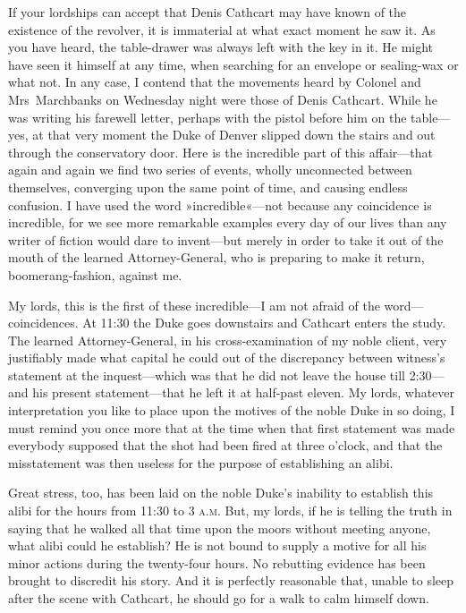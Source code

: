 \begin{dialogue}
 If your lordships can accept that Denis Cathcart may have known of the existence of the revolver, it is immaterial at what exact moment he saw it. As you have heard, the table-drawer was always left with the key in it. He might have seen it himself at any time, when searching for an envelope or sealing-wax or what not. In any case, I contend that the movements heard by Colonel and Mrs~Marchbanks on Wednesday night were those of Denis Cathcart. While he was writing his farewell letter, perhaps with the pistol before him on the table—yes, at that very moment the Duke of Denver slipped down the stairs and out through the conservatory door. Here is the incredible part of this affair—that again and again we find two series of events, wholly unconnected between themselves, converging upon the same point of time, and causing endless confusion. I have used the word »incredible«—not because any coincidence is incredible, for we see more remarkable examples every day of our lives than any writer of fiction would dare to invent—but merely in order to take it out of the mouth of the learned Attorney-General, who is preparing to make it return, boomerang-fashion, against me. 

\smallskip 

My lords, this is the first of these incredible—I am not afraid of the word—coincidences. At 11:30 the Duke goes downstairs and Cathcart enters the study. The learned Attorney-General, in his cross-examination of my noble client, very justifiably made what capital he could out of the discrepancy between witness's statement at the inquest—which was that he did not leave the house till 2:30—and his present statement—that he left it at half-past eleven. My lords, whatever interpretation you like to place upon the motives of the noble Duke in so doing, I must remind you once more that at the time when that first statement was made everybody supposed that the shot had been fired at three o'clock, and that the misstatement was then useless for the purpose of establishing an alibi.

\smallskip

Great stress, too, has been laid on the noble Duke's inability to establish this alibi for the hours from 11:30 to 3 \textsc{a.m.} But, my lords, if he is telling the truth in saying that he walked all that time upon the moors without meeting anyone, what alibi could he establish? He is not bound to supply a motive for all his minor actions during the twenty-four hours. No rebutting evidence has been brought to discredit his story. And it is perfectly reasonable that, unable to sleep after the scene with Cathcart, he should go for a walk to calm himself down.


\end{dialogue}
